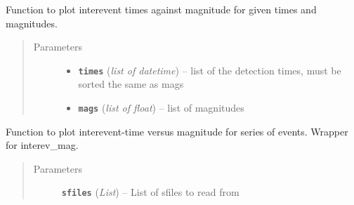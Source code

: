 \documentclass[a4paper,10pt,english]{sphinxmanual}
\begin{document}
\begin{fulllineitems}
\label{utils:EQcorrscan_plotting.interev_mag}
Function to plot interevent times against magnitude for given times
and magnitudes.
\begin{quote}\begin{description}
\item[{Parameters}] \leavevmode\begin{itemize}
\item {} 
\textbf{\texttt{times}} (\emph{list of datetime}) -- list of the detection times, must be sorted the same as mags

\item {} 
\textbf{\texttt{mags}} (\emph{list of float}) -- list of magnitudes

\end{itemize}

\end{description}\end{quote}

\end{fulllineitems}


\begin{fulllineitems}
\label{utils:EQcorrscan_plotting.interev_mag_sfiles}
Function to plot interevent-time versus magnitude for series of events.
Wrapper for interev\_mag.
\begin{quote}\begin{description}
\item[{Parameters}] \leavevmode
\textbf{\texttt{sfiles}} (\emph{List}) -- List of sfiles to read from

\end{description}\end{quote}

\end{fulllineitems}

\end{document}
